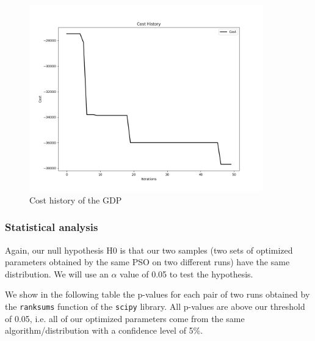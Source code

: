             \begin{figure}[H]
                \centering
                \includegraphics[width=0.9\textwidth]{img/opti/costHistoryGDP.png}
                \caption{Cost history of the GDP}
            \end{figure}

        \subsubsection{Statistical analysis}

        Again, our null hypothesis H0 is that our two samples (two sets of optimized parameters obtained by the same PSO on two different runs) have the same distribution. We will use an $\alpha$ value of 0.05 to test the hypothesis. 

        We show in the following table the p-values for each pair of two runs obtained by the \texttt{ranksums} function of the \texttt{scipy} library. All p-values are above our threshold of 0.05, i.e. all of our optimized parameters come from the same algorithm/distribution with a confidence level of 5\%.

